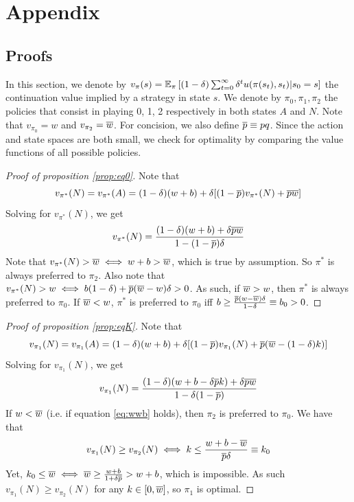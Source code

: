 {\newpage



\newpage
\section{Appendix}

\appendixpage

\startcontents[sections]

\subsection{Proofs}
\label{app:proofs}

In this section, we denote by $v_\pi(s) = \mathbb{E}_\pi \left[ (1-\delta) \sum_{t = 0}^\infty \delta^t u(\pi(s_t), s_t) | s_0 = s \right]$ the continuation value implied by a strategy in state $s$. We denote by $\pi_0, \pi_1, \pi_2$  the policies that consist in playing 0, 1, 2 respectively in both states $A$ and $N$. Note that $v_{\pi_0} = w$ and $v_{\pi_2} = \overline{w}$. For concision, we also define $\overline{p} \equiv pq$. Since the action and state spaces are both small, we check for optimality by comparing the value functions of all possible policies. 

\begin{proof}[Proof of proposition \ref{prop:eq0}]
    Note that 
    $$
    v_{\pi^*}(N) = v_{\pi^*}(A) = (1-\delta) (w+b) + \delta [(1-\overline{p}) v_{\pi^*}(N) + \overline{p} \overline{w}]
    $$
    Solving for $v_{\pi^*}(N)$, we get
    $$
    v_{\pi^*}(N) = \frac{(1-\delta)(w+b)+\delta \overline{p} \overline{w}}{1 - (1-\overline{p})\delta}
    $$
    Note that $v_{\pi^*}(N) > \overline{w} \iff w + b > \overline{w}$, which is true by assumption. So $\pi^*$ is always preferred to $\pi_2$. Also note that $v_{\pi^*}(N) > w \iff b (1-\delta) + \overline{p} (\overline{w} - w) \delta > 0$. As such, if $\overline{w} > w$, then $\pi^*$ is always preferred to $\pi_0$. If $\overline{w} < w$,  $\pi^*$  is preferred to $\pi_0$ iff $b \geq \frac{\overline{p} (w - \overline{w}) \delta}{1-\delta} \equiv b_0 > 0$.
\end{proof}

\begin{proof}[Proof of proposition \ref{prop:eqK}]
    Note that 
    $$
    v_{\pi_1}(N) = v_{\pi_1}(A) = (1-\delta) (w+b) + \delta [(1-\overline{p}) v_{\pi_1}(N) + \overline{p} (\overline{w} - (1-\delta) k)]
    $$
    Solving for $v_{\pi_1}(N)$, we get
    $$
    v_{\pi_1}(N) = \frac{(1-\delta)(w+b-\delta\overline{p} k)+\delta\overline{p} \overline{w}}{1-\delta(1-\overline{p})}
    $$
    If $w < \overline{w}$ (i.e. if equation \ref{eq:wwb} holds), then $\pi_2$ is preferred to $\pi_0$. We have that 
    $$
    v_{\pi_1}(N) \geq v_{\pi_2}(N) \iff k \leq \frac{w+b-\overline{w}}{\overline{p}\delta} \equiv k_0
    $$
    Yet, $k_0 \leq \overline{w} \iff \overline{w} \geq \frac{w+b}{1+\delta\overline{p}} > w+b$, which is impossible. As such $v_{\pi_1}(N) \geq v_{\pi_2}(N)$ for any $k \in [0,\overline{w}]$, so $\pi_1$ is optimal. 


\end{proof}}

